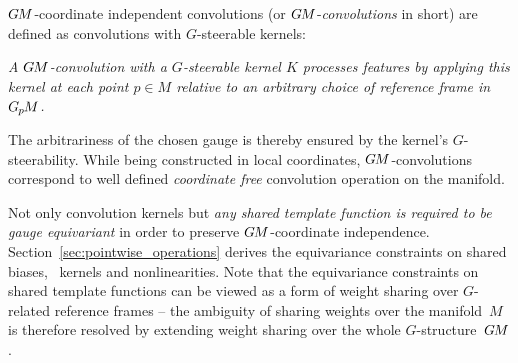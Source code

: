 \begin{samepage}
$G\mkern-1.4muM$-coordinate independent convolutions (or $G\mkern-1.4muM$-\emph{convolutions} in short)
{\setlength{\marginparwidth}{2.5cm}%
}%
are defined as convolutions with $G$-steerable kernels:
\begin{center}\it
    A $G\mkern-1.4muM$-convolution with a $G$-steerable kernel $K$ processes features by applying this \\
    kernel at each point $p\in M$ relative to an arbitrary choice of reference frame in $G_{\mkern-1.3mu p}\mkern-1.2muM$. \\
\end{center}
\end{samepage}
The arbitrariness of the chosen gauge is thereby ensured by the kernel's $G$-steerability.
While being constructed in local coordinates, 
$G\mkern-1.4muM$-convolutions correspond to well defined \emph{coordinate free} convolution operation on the manifold.


Not only convolution kernels but \emph{any shared template function is required to be gauge equivariant} in order to preserve $G\mkern-1.4muM$-coordinate independence.
Section~\ref{sec:pointwise_operations} derives the equivariance constraints on shared biases, \onexone\ kernels and nonlinearities.
Note that the equivariance constraints on shared template functions can be viewed as a form of weight sharing over $G$-related reference frames
-- the ambiguity of sharing weights over the manifold~$M$ is therefore resolved by extending weight sharing over the whole $G$-structure~$G\mkern-1.4muM$.



